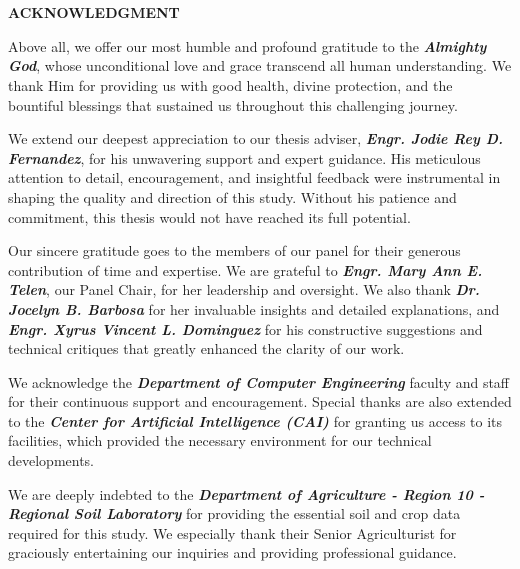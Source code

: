 \chapter*{}

\begin{center}
	{\bf ACKNOWLEDGMENT}\\[24pt]
\end{center}


{\baselineskip
	
	Above all, we offer our most humble and profound gratitude to the \textbf{\textit{Almighty God}}, whose unconditional love and grace transcend all human understanding. We thank Him for providing us with good health, divine protection, and the bountiful blessings that sustained us throughout this challenging journey.
	
	We extend our deepest appreciation to our thesis adviser, \textbf{\textit{Engr. Jodie Rey D. Fernandez}}, for his unwavering support and expert guidance. His meticulous attention to detail, encouragement, and insightful feedback were instrumental in shaping the quality and direction of this study. Without his patience and commitment, this thesis would not have reached its full potential.
	
	Our sincere gratitude goes to the members of our panel for their generous contribution of time and expertise. We are grateful to \textbf{\textit{Engr. Mary Ann E. Telen}}, our Panel Chair, for her leadership and oversight. We also thank \textbf{\textit{Dr. Jocelyn B. Barbosa}} for her invaluable insights and detailed explanations, and \textbf{\textit{Engr. Xyrus Vincent L. Dominguez}} for his constructive suggestions and technical critiques that greatly enhanced the clarity of our work.
	
	We acknowledge the \textbf{\textit{Department of Computer Engineering}} faculty and staff for their continuous support and encouragement. Special thanks are also extended to the \textbf{\textit{Center for Artificial Intelligence (CAI)}} for granting us access to its facilities, which provided the necessary environment for our technical developments.
	
	We are deeply indebted to the \textbf{\textit{Department of Agriculture - Region 10 - Regional Soil Laboratory}} for providing the essential soil and crop data required for this study. We especially thank their Senior Agriculturist for graciously entertaining our inquiries and providing professional guidance.
	
}
